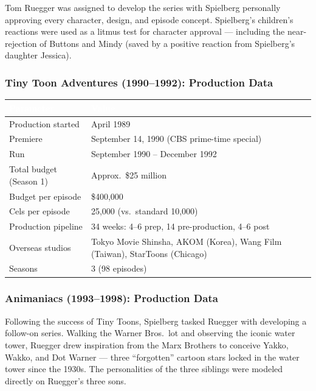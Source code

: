 \documentclass[11pt,letterpaper]{article}
\newcommand{\tableheader}[1]{\textbf{\sffamily\textcolor{white}{#1}}}
\begin{document}
Tom Ruegger was assigned to develop the series with Spielberg personally approving every character, design, and episode concept. Spielberg's children's reactions were used as a litmus test for character approval --- including the near-rejection of Buttons and Mindy (saved by a positive reaction from Spielberg's daughter Jessica).

\subsubsection{Tiny Toon Adventures (1990--1992): Production Data}

\begin{center}
\begin{tabularx}{\textwidth}{L{4cm}X}
\toprule
{}
\tableheader{Parameter} & \tableheader{Value} \\
\midrule
Production started & April 1989 \\
Premiere & September 14, 1990 (CBS prime-time special) \\
Run & September 1990 -- December 1992 \\
Total budget (Season 1) & Approx.\ \$25 million \\
Budget per episode & \$400,000 \\
Cels per episode & 25,000 (vs.\ standard 10,000) \\
Production pipeline & 34 weeks: 4--6 prep, 14 pre-production, 4--6 post \\
Overseas studios & Tokyo Movie Shinsha, AKOM (Korea), Wang Film (Taiwan), StarToons (Chicago) \\
Seasons & 3 (98 episodes) \\
\bottomrule
\end{tabularx}
\end{center}

\subsubsection{Animaniacs (1993--1998): Production Data}

Following the success of Tiny Toons, Spielberg tasked Ruegger with developing a follow-on series. Walking the Warner Bros.\ lot and observing the iconic water tower, Ruegger drew inspiration from the Marx Brothers to conceive Yakko, Wakko, and Dot Warner --- three ``forgotten'' cartoon stars locked in the water tower since the 1930s. The personalities of the three siblings were modeled directly on Ruegger's three sons.
\end{document}
